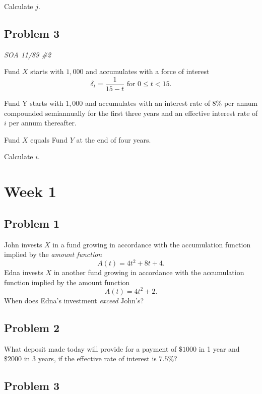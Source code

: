 \documentclass[
]{book}
\begin{document}
Calculate \(j\).

\hypertarget{problem-3-1}{%
\subsection*{Problem 3}\label{problem-3-1}}

\emph{SOA 11/89 \#2}

Fund \(X\) starts with \(1,000\) and accumulates with a force of interest \[\delta_{t}=\frac{1}{15-t} \text{ for } 0 \le t< 15.\]

Fund Y starts with \(1,000\) and accumulates with an interest rate of 8\% per annum compounded semiannually for the first three years and an effective interest rate of \(i\) per annum thereafter.

Fund \(X\) equals Fund \(Y\) at the end of four years.

Calculate \(i\).

\hypertarget{week-1}{%
\section*{Week 1}\label{week-1}}

\hypertarget{problem-1-2}{%
\subsection*{Problem 1}\label{problem-1-2}}

John invests \(X\) in a fund growing in accordance with the accumulation function implied by the \emph{amount function}
\[A(t)=4t^2+8t+4.\]
Edna invests \(X\) in another fund growing in accordance with the accumulation function implied by the amount function \[A(t)=4t^2+2.\]
When does Edna's investment \emph{exceed} John's?

\hypertarget{problem-2-2}{%
\subsection*{Problem 2}\label{problem-2-2}}

What deposit made today will provide for a payment of \(\$1000\) in 1 year and \(\$2000\) in 3 years, if the effective rate of interest is \(7.5\%\)?

\hypertarget{problem-3-2}{%
\subsection*{Problem 3}\label{problem-3-2}}
\end{document}
